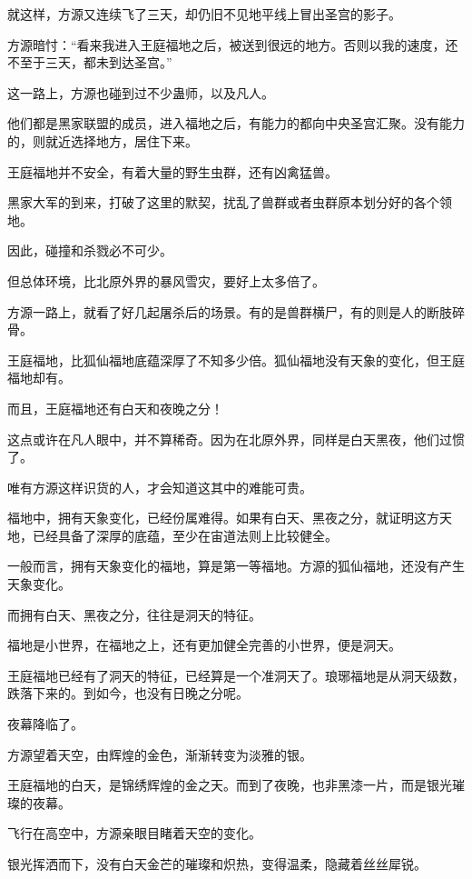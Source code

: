 
\begin{this_body}

就这样，方源又连续飞了三天，却仍旧不见地平线上冒出圣宫的影子。

方源暗忖：“看来我进入王庭福地之后，被送到很远的地方。否则以我的速度，还不至于三天，都未到达圣宫。”

这一路上，方源也碰到过不少蛊师，以及凡人。

他们都是黑家联盟的成员，进入福地之后，有能力的都向中央圣宫汇聚。没有能力的，则就近选择地方，居住下来。

王庭福地并不安全，有着大量的野生虫群，还有凶禽猛兽。

黑家大军的到来，打破了这里的默契，扰乱了兽群或者虫群原本划分好的各个领地。

因此，碰撞和杀戮必不可少。

但总体环境，比北原外界的暴风雪灾，要好上太多倍了。

方源一路上，就看了好几起屠杀后的场景。有的是兽群横尸，有的则是人的断肢碎骨。

王庭福地，比狐仙福地底蕴深厚了不知多少倍。狐仙福地没有天象的变化，但王庭福地却有。

而且，王庭福地还有白天和夜晚之分！

这点或许在凡人眼中，并不算稀奇。因为在北原外界，同样是白天黑夜，他们过惯了。

唯有方源这样识货的人，才会知道这其中的难能可贵。

福地中，拥有天象变化，已经份属难得。如果有白天、黑夜之分，就证明这方天地，已经具备了深厚的底蕴，至少在宙道法则上比较健全。

一般而言，拥有天象变化的福地，算是第一等福地。方源的狐仙福地，还没有产生天象变化。

而拥有白天、黑夜之分，往往是洞天的特征。

福地是小世界，在福地之上，还有更加健全完善的小世界，便是洞天。

王庭福地已经有了洞天的特征，已经算是一个准洞天了。琅琊福地是从洞天级数，跌落下来的。到如今，也没有日晚之分呢。

夜幕降临了。

方源望着天空，由辉煌的金色，渐渐转变为淡雅的银。

王庭福地的白天，是锦绣辉煌的金之天。而到了夜晚，也非黑漆一片，而是银光璀璨的夜幕。

飞行在高空中，方源亲眼目睹着天空的变化。

银光挥洒而下，没有白天金芒的璀璨和炽热，变得温柔，隐藏着丝丝犀锐。


\end{this_body}
